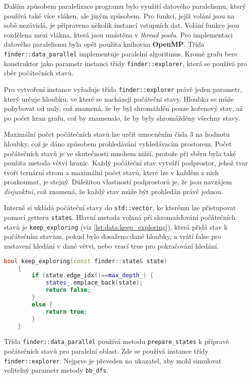 Dalším způsobem paralelizace programu bylo využití datového paralelismu, který používá také více vláken, ale jiným způsobem.
Pro funkci, jejíž volání jsou na sobě nezávislá, je připraveno několik instancí vstupních dat.
Volání funkce jsou rozdělena mezi vlákna, která jsou umístěna v \textit{thread poolu}.
Pro implementaci datového paralelismu byla opět použita knihovna \textbf{OpenMP}.
Třída \texttt{finder::data\_parallel} implementuje paralelní algoritmus.
Kromě grafu bere konstruktor jako parametr instanci třídy \texttt{finder::explorer}, která se používá pro sběr počátečních stavů. 

Pro vytvoření instance vyžaduje třída \texttt{finder::explorer}  právě jeden parametr, který určuje hloubku, ve které se nacházejí počáteční stavy.
Hloubka se může pohybovat od nuly, což znamená, že by byl shromážděn pouze kořenový stav, až po počet hran grafu, což by znamenalo, že by byly shromážděny všechny stavy.

Maximální počet počátečních stavů lze určit umocněním čísla 3 na hodnotu hloubky, což je dáno způsobem prohledávání vyhledávacím prostorem.
Počet počátečních stavů je ve skutečnosti mnohem nižší, protože při sběru byla také použita metoda větví hranic.
Každý počáteční stav vytváří podprostor, jehož tvar tvoří ternární strom a maximální počet stavů, které lze v každém z nich prozkoumat, je stejný.
Důležitou vlastností podprostorů je, že jsou navzájem \textit{disjunktní}, což znamená, že každý stav může být prohledán právě jednou.

Interně si ukládá počáteční stavy do \texttt{std::vector}, ke kterému lze přistupovat pomocí getteru \texttt{states}.
Hlavní metoda volaná při shromažďování počátečních stavů je \texttt{keep\_exploring} (viz \ref{lst:data:keep_exploring}), která přidá stav k počátečním stavům, pokud bylo dosaženo dané hloubky, a vrátí false pro zastavení hledání v dané větvi, nebo vrací true pro pokračování hledání.

\begin{lstlisting}[language=C++, label={lst:data:keep_exploring}, title={Metoda pro řízení prohledávání}]
    bool keep_exploring(const finder::state& state)
    {
        if (state.edge_idx()==max_depth_) {
            states_.emplace_back(state);
            return false;
        }
        else {
            return true;
        }
    }
\end{lstlisting}

Třída \texttt{finder::data\_parallel} používá metodu \texttt{prepare\_states} k přípravě počátečních stavů pro paralelní oblast.
Zde se používá instance třídy \texttt{finder::explorer}.
Nejprve je převeden na ukazatel, aby mohl simulovat volitelný parametr metody \texttt{bb\_dfs}.

